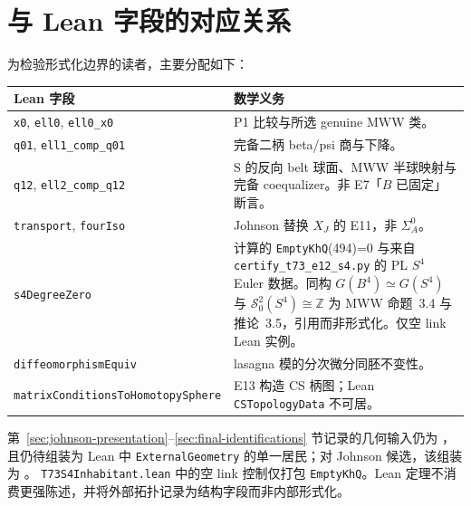 \section{与 Lean 字段的对应关系}\label{app:lean-fields}

为检验形式化边界的读者，主要分配如下：
\begin{center}
\small
\begin{tabularx}{\textwidth}{@{}l X@{}}
\toprule
Lean 字段 & 数学义务 \\
\midrule
\texttt{x0}, \texttt{ell0}, \texttt{ell0\_x0} & P1 比较与所选 genuine MWW 类。 \\
\texttt{q01}, \texttt{ell1\_comp\_q01} & 完备二柄 beta/psi 商与下降。 \\
\texttt{q12}, \texttt{ell2\_comp\_q12} & S 的反向 belt 球面、MWW 半球映射与完备 coequalizer。非 E7「$B$ 已固定」断言。 \\
\texttt{transport}, \texttt{fourIso} & Johnson 替换 $X_J$ 的 E11，非 $\Sigma_A^0$。 \\
\texttt{s4DegreeZero} & 计算的 \texttt{EmptyKhQ}(494)=0 与来自 \texttt{certify\_t73\_e12\_s4.py} 的 PL $S^4$ Euler 数据。同构 $G(B^4)\simeq G(S^4)$ 与 $\mathcal S^2_0(S^4)\cong\mathbb Z$ 为 MWW 命题~3.4 与推论~3.5，引用而非形式化。仅空 link Lean 实例。 \\
\texttt{diffeomorphismEquiv} & lasagna 模的分次微分同胚不变性。 \\
\texttt{matrixConditionsToHomotopySphere} & E13 构造 CS 柄图；Lean \texttt{CSTopologyData} 不可居。 \\
\bottomrule
\end{tabularx}
\end{center}

第~\ref{sec:johnson-presentation}--\ref{sec:final-identifications} 节记录的几何输入仍为 \Open，且仍待组装为 Lean 中 \texttt{ExternalGeometry} 的单一居民；对 Johnson 候选，该组装为 \Open。
\texttt{T73S4Inhabitant.lean} 中的空 link 控制仅打包 \texttt{EmptyKhQ}。Lean 定理不消费更强陈述，并将外部拓扑记录为结构字段而非内部形式化。



